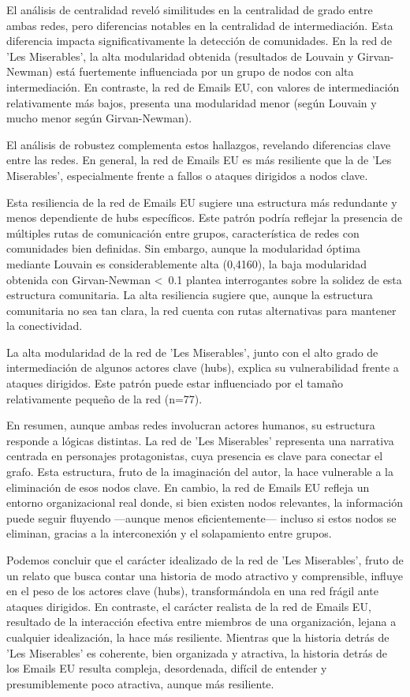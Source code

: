 \documentclass[conference]{IEEEtran}
\begin{document}
El análisis de centralidad reveló similitudes en la centralidad de grado entre ambas redes, pero diferencias notables en la centralidad de intermediación. Esta diferencia impacta significativamente la detección de comunidades. En la red de 'Les Miserables', la alta modularidad obtenida (resultados de Louvain y Girvan-Newman) está fuertemente influenciada por un grupo de nodos con alta intermediación. En contraste, la red de Emails EU, con valores de intermediación relativamente más bajos, presenta una modularidad menor (según Louvain y mucho menor según Girvan-Newman).

El análisis de robustez complementa estos hallazgos, revelando diferencias clave entre las redes. En general, la red de Emails EU es más resiliente que la de 'Les Miserables', especialmente frente a fallos o ataques dirigidos a nodos clave.

Esta resiliencia de la red de Emails EU sugiere una estructura más redundante y menos dependiente de hubs específicos. Este patrón podría reflejar la presencia de múltiples rutas de comunicación entre grupos, característica de redes con comunidades bien definidas. Sin embargo, aunque la modularidad óptima mediante Louvain es considerablemente alta (0,4160), la baja modularidad obtenida con Girvan-Newman \textless~0.1 plantea interrogantes sobre la solidez de esta estructura comunitaria. La alta resiliencia sugiere que, aunque la estructura comunitaria no sea tan clara, la red cuenta con rutas alternativas para mantener la conectividad.

La alta modularidad de la red de 'Les Miserables', junto con el alto grado de intermediación de algunos actores clave (hubs), explica su vulnerabilidad frente a ataques dirigidos. Este patrón puede estar influenciado por el tamaño relativamente pequeño de la red (n=77).

En resumen, aunque ambas redes involucran actores humanos, su estructura responde a lógicas distintas. La red de 'Les Miserables' representa una narrativa centrada en personajes protagonistas, cuya presencia es clave para conectar el grafo. Esta estructura, fruto de la imaginación del autor, la hace vulnerable a la eliminación de esos nodos clave. En cambio, la red de Emails EU refleja un entorno organizacional real donde, si bien existen nodos relevantes, la información puede seguir fluyendo —aunque menos eficientemente— incluso si estos nodos se eliminan, gracias a la interconexión y el solapamiento entre grupos.

Podemos concluir que el carácter idealizado de la red de 'Les Miserables', fruto de un relato que busca contar una historia de modo atractivo y comprensible, influye en el peso de los actores clave (hubs), transformándola en una red frágil ante ataques dirigidos. En contraste, el carácter realista de la red de Emails EU, resultado de la interacción efectiva entre miembros de una organización, lejana a cualquier idealización, la hace más resiliente. Mientras que la historia detrás de 'Les Miserables' es coherente, bien organizada y atractiva, la historia detrás de los Emails EU resulta compleja, desordenada, difícil de entender y presumiblemente poco atractiva, aunque más resiliente.
\end{document}

